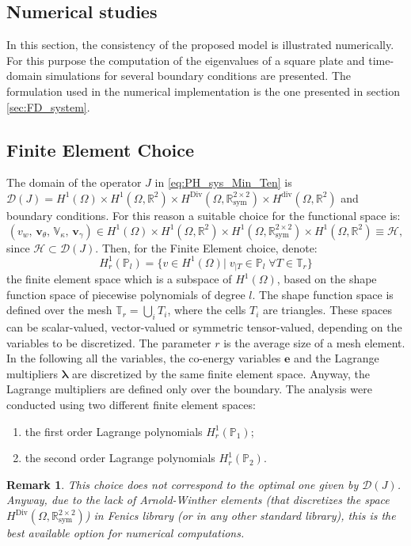 \documentclass[preprint,12pt]{elsarticle}
\newcommand{\firstReviewer}[1]{\textcolor{red!80!black}{#1}}
\newtheorem{remark}{Remark}
\begin{document}
\firstReviewer{
\section{Numerical studies}
\label{sec:Num}
In this section, the consistency of the proposed model is illustrated numerically. For this purpose the computation of the eigenvalues of a square plate and time-domain simulations for several boundary conditions are presented. The formulation used in the numerical implementation is the one presented in section \ref{sec:FD_system}. 
\subsection{Finite Element Choice}
The domain of the operator $J$ in \eqref{eq:PH_sys_Min_Ten} is $\mathcal{D}(J) = H^{1}(\Omega) \times H^{1}(\Omega, \mathbb{R}^2) \times H^{\text{Div}}(\Omega, \mathbb{R}^{2 \times 2}_{\text{sym}}) \times H^{\text{div}}(\Omega, \mathbb{R}^2)$ and boundary conditions. For this reason a suitable choice for the functional space is:
\begin{equation*}
	(v_w, \, \bm{v}_\theta, \, \mathbb{V}_\kappa, \, \bm{v}_{\gamma}) \in H^{1}(\Omega) \times H^{1}(\Omega, \mathbb{R}^2) \times H^{1}(\Omega, \mathbb{R}^{2 \times 2}_{\text{sym}}) \times H^{1}(\Omega, \mathbb{R}^2) \equiv \mathscr{H},
\end{equation*}
since $\mathscr{H} \subset \mathcal{D}(J)$. Then, for the Finite Element choice, denote:
\[ H_r^1(\mathbb{P}_l) = \{ v \in H^1(\Omega)|\; v_{|T} \in \mathbb{P}_l \; \forall T \in \mathbb{T}_r \} 
\]
the finite element space which is a subspace of $H^1(\Omega)$, based on the shape function space of piecewise polynomials of degree $l$. The shape function space is defined over the mesh $\mathbb{T}_r = \bigcup_i T_i$, where the cells $T_i$ are triangles. These spaces can be scalar-valued, vector-valued or symmetric tensor-valued, depending on the variables to be discretized. The parameter $r$ is the average size of a mesh element. In the following all the variables, the co-energy variables $\bm{e}$ and the Lagrange multipliers $\bm\lambda$ are discretized by the same finite element space. Anyway, the Lagrange multipliers are defined only over the boundary. The analysis were conducted using two different finite element spaces:
\begin{enumerate}
	\item the first order Lagrange polynomials $H_r^1(\mathbb{P}_1)$;
	\item the second order Lagrange polynomials $H_r^1(\mathbb{P}_2)$.
\end{enumerate}
\begin{remark}
This choice does not correspond to the optimal one given by $\mathcal{D}(J)$. Anyway, due to the lack of Arnold-Winther elements \cite{Arnold2002} (that discretizes the space $H^{\text{Div}}(\Omega, \mathbb{R}^{2 \times 2}_{\text{sym}})$) in Fenics library (or in any other standard library), this is the best available option for numerical computations.
\end{remark}
}
\end{document}

